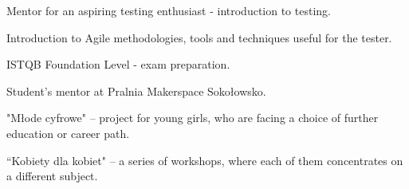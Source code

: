 \begin{scholarship}
 {Mentor for an aspiring testing enthusiast - introduction to testing.  
    \itemize
        \item{}{Introduction to Agile methodologies, tools and techniques useful for the tester.}
        \item{}{ISTQB Foundation Level - exam preparation.}
    \enditemize}
 {Student’s mentor at Pralnia Makerspace Sokołowsko.
    \itemize
        \item{}{"Młode cyfrowe" – project for young girls, who are facing a choice of further education or career path.} 
        \item{}{“Kobiety dla kobiet" – a series of workshops, where each of them concentrates on a different subject.}  
    \enditemize}
\end{scholarship}